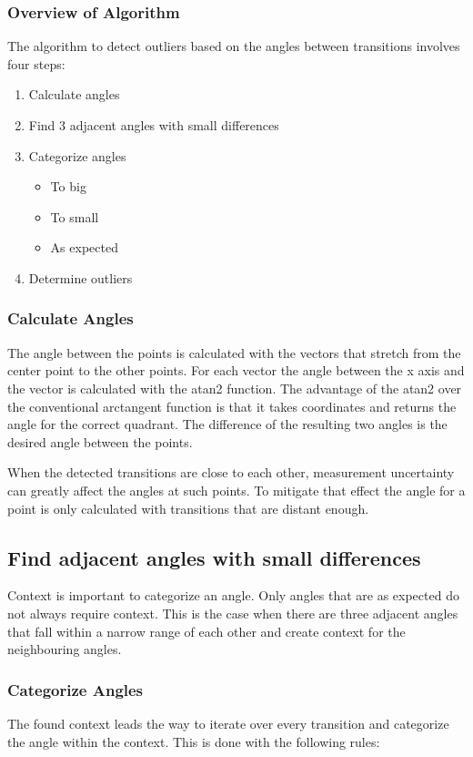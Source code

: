 \subsubsection{Overview of Algorithm}
\label{sec:descriptionOfAngleValidation}

The algorithm to detect outliers based on the angles between transitions involves four steps:

\begin{enumerate}
	\item Calculate angles
	\item Find 3 adjacent angles with small differences
	\item Categorize angles
	\begin{itemize}
		\item To big
		\item To small
		\item As expected 
	\end{itemize}
	\item Determine outliers
\end{enumerate}
\subsubsection{Calculate Angles}
\label{sec:calculateAngles}
The angle between the points is calculated with the vectors that stretch from the center point to the other points. For each vector the angle between the x axis and the vector is calculated with the atan2 function. The advantage of the atan2 over the conventional arctangent function is that it takes coordinates and returns the angle for the correct quadrant. The difference of the resulting two angles is the desired angle between the points. 

When the detected transitions are close to each other, measurement uncertainty can greatly affect the angles at such points. To mitigate that effect the angle for a point is only calculated with transitions that are distant enough.
\subsection{Find adjacent angles with small differences}
Context is important to categorize an angle. Only angles that are as expected do not always require context. This is the case when there are three adjacent angles that fall within a narrow range of each other and create context for the neighbouring angles.
\subsubsection{Categorize Angles}
The found context leads the way to iterate over every transition and categorize the angle within the context. This is done with the following rules:

